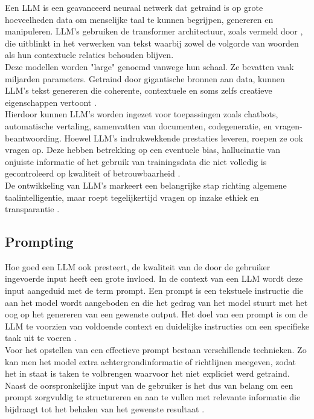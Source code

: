 Een LLM is een geavanceerd neuraal netwerk dat getraind is op grote hoeveelheden data om menselijke taal te kunnen begrijpen, genereren en manipuleren. LLM's gebruiken de transformer architectuur, zoals vermeld door \textcite{vaswani2023attentionneed}, die uitblinkt in het verwerken van tekst waarbij zowel de volgorde van woorden als hun contextuele relaties behouden blijven.
\\[1em]
Deze modellen worden "large" genoemd vanwege hun schaal. Ze bevatten vaak miljarden parameters. Getraind door gigantische bronnen aan data, kunnen LLM's tekst genereren die coherente, contextuele en soms zelfs creatieve eigenschappen vertoont \autocite{Gupta2025}.
\\[1em]
Hierdoor kunnen LLM’s worden ingezet voor toepassingen zoals chatbots, automatische vertaling, samenvatten van documenten, codegeneratie, en vragen-beantwoording. Hoewel LLM’s indrukwekkende prestaties leveren, roepen ze ook vragen op. Deze hebben betrekking op een eventuele bias, hallucinatie van onjuiste informatie of het gebruik van trainingsdata die niet volledig is gecontroleerd op kwaliteit of betrouwbaarheid \autocite{Gupta2025}.
\\[1em]
De ontwikkeling van LLM’s markeert een belangrijke stap richting algemene taalintelligentie, maar roept tegelijkertijd vragen op inzake ethiek en transparantie \autocite{Gupta2025}.

\subsection{Prompting} 

Hoe goed een LLM ook presteert, de kwaliteit van de door de gebruiker ingevoerde input heeft een grote invloed. In de context van een LLM wordt deze input aangeduid met de term prompt. Een prompt is een tekstuele instructie die aan het model wordt aangeboden en die het gedrag van het model stuurt met het oog op het genereren van een gewenste output. Het doel van een prompt is om de LLM te voorzien van voldoende context en duidelijke instructies om een specifieke taak uit te voeren \autocite{Marvin2024}.
\\[1em]
Voor het opstellen van een effectieve prompt bestaan verschillende technieken. Zo kan men het model extra achtergrondinformatie of richtlijnen meegeven, zodat het in staat is taken te volbrengen waarvoor het niet expliciet werd getraind. Naast de oorspronkelijke input van de gebruiker is het dus van belang om een prompt zorgvuldig te structureren en aan te vullen met relevante informatie die bijdraagt tot het behalen van het gewenste resultaat \autocite{Marvin2024}.

